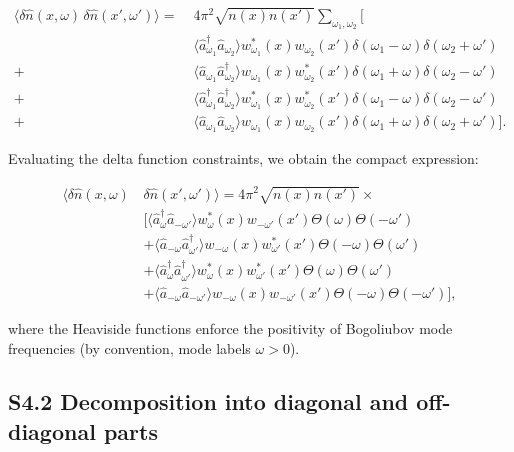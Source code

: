 \documentclass[prd,aps,showpacs,superscriptaddress,twocolumn]{revtex4-2}
\begin{document}
\begin{align}
\langle \delta\hat{n}(x,\omega) \, \delta\hat{n}(x',\omega') \rangle = \;& 4\pi^2 \sqrt{n(x) n(x')} \sum_{\omega_1,\omega_2} \Big[ \nonumber\\
&\langle \hat{a}_{\omega_1}^\dagger \hat{a}_{\omega_2} \rangle w_{\omega_1}^*(x) w_{\omega_2}(x') \delta(\omega_1 - \omega) \delta(\omega_2 + \omega') \nonumber\\
+ &\langle \hat{a}_{\omega_1} \hat{a}_{\omega_2}^\dagger \rangle w_{\omega_1}(x) w_{\omega_2}^*(x') \delta(\omega_1 + \omega) \delta(\omega_2 - \omega') \nonumber\\
+ &\langle \hat{a}_{\omega_1}^\dagger \hat{a}_{\omega_2}^\dagger \rangle w_{\omega_1}^*(x) w_{\omega_2}^*(x') \delta(\omega_1 - \omega) \delta(\omega_2 - \omega') \nonumber\\
+ &\langle \hat{a}_{\omega_1} \hat{a}_{\omega_2} \rangle w_{\omega_1}(x) w_{\omega_2}(x') \delta(\omega_1 + \omega) \delta(\omega_2 + \omega') \Big].
\label{eq:G2_freq_full}
\end{align}

Evaluating the delta function constraints, we obtain the compact expression:

\begin{align}
\langle \delta\hat{n}(x,\omega) \, &\delta\hat{n}(x',\omega') \rangle = 4\pi^2 \sqrt{n(x) n(x')} \times \nonumber\\
&\Big[ \langle \hat{a}_{\omega}^\dagger \hat{a}_{-\omega'} \rangle w_\omega^*(x) w_{-\omega'}(x') \Theta(\omega) \Theta(-\omega') \nonumber\\
&+ \langle \hat{a}_{-\omega} \hat{a}_{\omega'}^\dagger \rangle w_{-\omega}(x) w_{\omega'}^*(x') \Theta(-\omega) \Theta(\omega') \nonumber\\
&+ \langle \hat{a}_{\omega}^\dagger \hat{a}_{\omega'}^\dagger \rangle w_\omega^*(x) w_{\omega'}^*(x') \Theta(\omega) \Theta(\omega') \nonumber\\
&+ \langle \hat{a}_{-\omega} \hat{a}_{-\omega'} \rangle w_{-\omega}(x) w_{-\omega'}(x') \Theta(-\omega) \Theta(-\omega') \Big],
\label{eq:G2_freq_compact}
\end{align}

where the Heaviside functions enforce the positivity of Bogoliubov mode frequencies (by convention, mode labels $\omega > 0$).

\subsection{S4.2 Decomposition into diagonal and off-diagonal parts}
\end{document}
